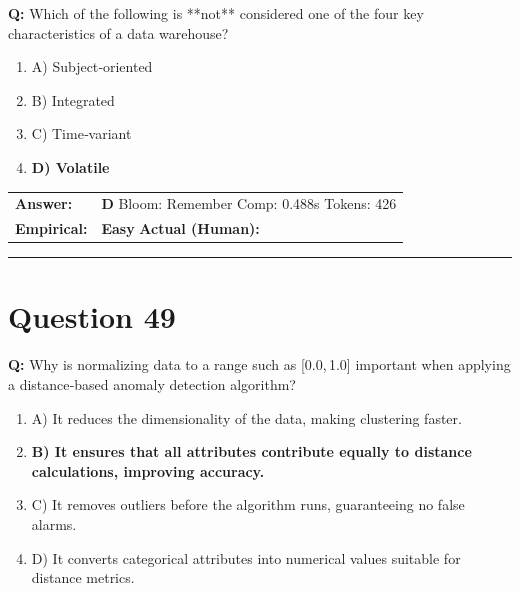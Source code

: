 \documentclass[9pt]{article}
\begin{document}
\textbf{Q:} Which of the following is **not** considered one of the four key characteristics of a data warehouse?

\begin{enumerate}[label=\textbf{\alph{*})}, nosep]
    \item A) Subject‑oriented
    \item B) Integrated
    \item C) Time‑variant
    \item \textbf{D) Volatile} %

\end{enumerate}

\begin{tabular}{@{}l p{10.5cm}@{}}
\textbf{Answer:} & \textbf{D} \hspace{1em} Bloom: Remember \hspace{1em} Comp: 0.488s \hspace{1em} Tokens: 426 \\
\textbf{Empirical:} & \textbf{Easy} \hspace{1em} \textbf{Actual (Human):} \underline{\hspace{5cm}}
\end{tabular}

\vspace{0.2cm}
\rule{\textwidth}{0.4pt}
\vspace{0.2cm}


\section*{Question 49}

\textbf{Q:} Why is normalizing data to a range such as [0.0, 1.0] important when applying a distance‑based anomaly detection algorithm?

\begin{enumerate}[label=\textbf{\alph{*})}, nosep]
    \item A) It reduces the dimensionality of the data, making clustering faster.
    \item \textbf{B) It ensures that all attributes contribute equally to distance calculations, improving accuracy.} %
    \item C) It removes outliers before the algorithm runs, guaranteeing no false alarms.
    \item D) It converts categorical attributes into numerical values suitable for distance metrics.

\end{enumerate}
\end{document}
